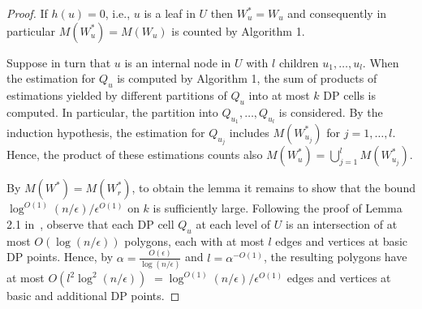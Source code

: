 \documentclass[a4paper]{article}
\begin{document}
\begin{proof}
If $h(u)=0$, i.e., $u$ is a leaf
in $U$ then $W_u^*=W_u$ and consequently 
in particular $M(W_u^*)=M(W_u)$
is counted by  Algorithm 1.

Suppose in turn that $u$ is an internal
node in $U$ with $l$ children $u_1,\dots,u_l$.
When the estimation 
for $Q_u$ is computed by Algorithm 1, the sum
of products of estimations yielded by
different partitions of $Q_u$ into at most
$k$ DP cells is computed. In particular,
the partition into $Q_{u_1},\dots,Q_{u_l}$ is
considered. By the induction
hypothesis, the estimation for
$Q_{u_j}$ includes $M(W^*_{u_j})$ 
for $j=1,\dots,l$. Hence,
the product of these estimations
counts also $M(W_u^*)=\bigcup^l_{j=1}M(W^*_{u_j})$. 

By $M(W^*)=M(W_r^*)$, to obtain the lemma 
it remains to show that the bound
$\log^{O(1)} (n/\epsilon)/\epsilon^{O(1)}$
on $k$ is sufficiently large. 
Following the proof of Lemma 2.1 in~\cite{AW14},
observe that each DP cell $Q_u$ at each level
of $U$ is an intersection of at most
$O(\log (n/\epsilon ))$ polygons, each with
at most $l$ edges and vertices at basic DP points.
Hence, by $\alpha = \frac {O(\epsilon )}{\log (n/\epsilon)}$
and $l=\alpha^{-O(1)}$,
the resulting polygons have at
most $O(l^2\log^2 (n/\epsilon))$
$=\log^{O(1)} (n/\epsilon)/\epsilon^{O(1)}$
edges and vertices at basic and additional
DP points.
\end{proof} 
\end{document}
